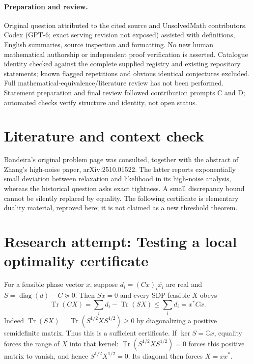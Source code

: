 \documentclass[11pt]{article}
\begin{document}
\paragraph{Preparation and review.}
Original question attributed to the cited source and UnsolvedMath contributors. Codex (GPT-6; exact serving revision not exposed) assisted with definitions, English summaries, source inspection and formatting. No new human mathematical authorship or independent proof verification is asserted. Catalogue identity checked against the complete supplied registry and existing repository statements; known flagged repetitions and obvious identical conjectures excluded. Full mathematical-equivalence/literature review has not been performed. Statement preparation and final review followed contribution prompts C and D; automated checks verify structure and identity, not open status.
\label{end:statement}

\section{Literature and context check}
Bandeira's original problem page was consulted, together with the abstract of
Zhang's high-noise paper, arXiv:2510.01522. The latter reports exponentially small
deviation between relaxation and likelihood in its high-noise analysis, whereas
the historical question asks exact tightness. A small discrepancy bound cannot be
silently replaced by equality. The following certificate is elementary duality
material, reproved here; it is not claimed as a new threshold theorem.
\section{Research attempt: Testing a local optimality certificate}
For a feasible phase vector $x$, suppose $d_i=(Cx)_i\overline{x_i}$ are real and
$S=\operatorname{diag}(d)-C\succeq0$. Then $Sx=0$ and every SDP-feasible $X$ obeys
\[
 \operatorname{Tr}(CX)=\sum_i d_i-\operatorname{Tr}(SX)\le\sum_i d_i=x^*Cx.
\]
Indeed $\operatorname{Tr}(SX)=\operatorname{Tr}(S^{1/2}XS^{1/2})\ge0$ by
diagonalizing a positive semidefinite matrix. Thus this is a sufficient certificate.
If $\ker S=\mathbb Cx$, equality forces the range of $X$ into that kernel:
$\operatorname{Tr}(S^{1/2}XS^{1/2})=0$ forces this positive matrix to vanish,
and hence $S^{1/2}X^{1/2}=0$. Its diagonal then forces $X=xx^*$.
\end{document}
